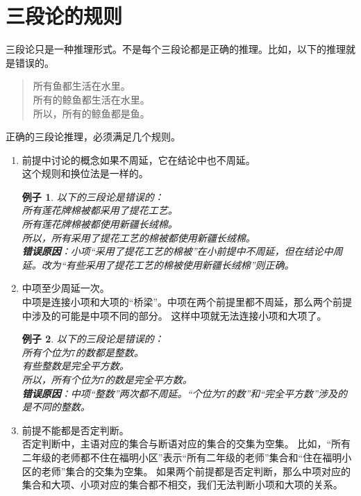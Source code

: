 \documentclass[12pt,UTF8]{ctexbook}
\newtheorem*{ex*}{例子}
\begin{document}
\section{三段论的规则}
三段论只是一种推理形式。不是每个三段论都是正确的推理。比如，以下的推理就是错误的。
\begin{quotation}
    \noindent 所有鱼都生活在水里。\\    
    所有的鲸鱼都生活在水里。\\    
    所以，所有的鲸鱼都是鱼。
\end{quotation}

正确的三段论推理，必须满足几个规则。
\begin{enumerate}
    \item[1.] 前提中讨论的概念如果不周延，它在结论中也不周延。\\
    这个规则和换位法是一样的。
    \begin{ex*}
        以下的三段论是错误的： \\
        \indent 所有莲花牌棉被都采用了提花工艺。\\
        \indent 所有莲花牌棉被都使用新疆长绒棉。\\
        \indent 所以，所有采用了提花工艺的棉被都使用新疆长绒棉。\\
        \textbf{错误原因}：小项“采用了提花工艺的棉被”在小前提中不周延，但在结论中周延。改为“有些采用了提花工艺的棉被使用新疆长绒棉”则正确。
    \end{ex*}
    \item[2.] 中项至少周延一次。\\
    中项是连接小项和大项的“桥梁”。中项在两个前提里都不周延，那么两个前提中涉及的可能是中项不同的部分。
    这样中项就无法连接小项和大项了。 
    \begin{ex*}
        以下的三段论是错误的： \\
        \indent 所有个位为$7$的数都是整数。\\
        \indent 有些整数是完全平方数。\\
        \indent 所以，所有个位为$7$的数是完全平方数。\\
        \textbf{错误原因}：中项“整数”两次都不周延。“个位为$7$的数”和“完全平方数”涉及的是不同的整数。
    \end{ex*}    
    \item[3.] 前提不能都是否定判断。\\
    否定判断中，主语对应的集合与断语对应的集合的交集为空集。
    比如，“所有二年级的老师都不住在福明小区”表示“所有二年级的老师”集合和“住在福明小区的老师”集合的交集为空集。
    如果两个前提都是否定判断，那么中项对应的集合和大项、小项对应的集合都不相交，我们无法判断小项和大项的关系。

\end{enumerate}
\end{document}
